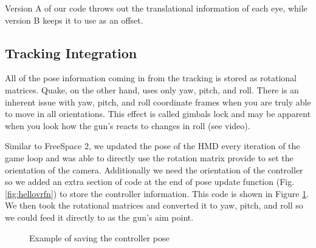 \documentclass[journal]{IEEEtran}
\begin{document}
Version A of our code throws out the translational information of each eye, while version B keeps it to use as an offset. 

\subsection{Tracking Integration}

All of the pose information coming in from the tracking is stored as rotational matrices. Quake, on the other hand, uses only yaw, pitch, and roll. There is an inherent issue with yaw, pitch, and roll coordinate frames when you are truly able to move in all orientations. This effect is called gimbals lock and may be apparent when you look how the gun's reacts to changes in roll (see video).

Similar to FreeSpace 2, we updated the pose of the HMD every iteration of the game loop and was able to directly use the rotation matrix provide to set the orientation of the camera. Additionally we need the orientation of the controller so we added an extra section of code at the end of pose update function (Fig. \ref*{fig:hellovrfn}) to store the controller information. This code is shown in Figure \ref{controller_pose}. We then took the rotational matrices and converted it to yaw, pitch, and roll so we could feed it directly to as the gun's aim point. 

\begin{figure}[h]
	\noindent
	\centering
	\caption{Example of saving the controller pose}\label{controller_pose}
\end{figure}
\end{document}
